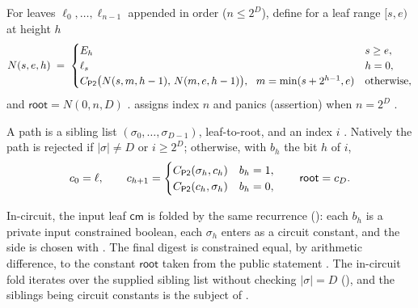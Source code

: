 \begin{definition}[Root]
For leaves $\ell_0,\dots,\ell_{n-1}$ appended in order ($n \le 2^D$), define for a
leaf range $[s,e)$ at height $h$
\begin{equation}
  N(s,e,h) \;=\;
  \begin{cases}
    E_h & s \ge e,\\
    \ell_s & h = 0,\\
    C_{\mathsf{P2}}\big(N(s,m,h-1),\,N(m,e,h-1)\big), \ \ m = \min(s+2^{h-1}, e) & \text{otherwise},
  \end{cases}
\end{equation}
and $\mathsf{root} = N(0, n, D)$ .
 assigns index $n$ and panics (assertion) when $n = 2^D$
.
\end{definition}

\begin{definition}
\label{def:ss-membership}
A path is a sibling list $(\sigma_0,\dots,\sigma_{D-1})$, leaf-to-root, and an
index $i$ . Natively the path is
rejected if $|\sigma| \ne D$ or $i \ge 2^D$; otherwise, with $b_h$ the bit $h$
of $i$,
\begin{equation}
  c_0 = \ell, \qquad
  c_{h+1} =
  \begin{cases}
    C_{\mathsf{P2}}(\sigma_h, c_h) & b_h = 1,\\
    C_{\mathsf{P2}}(c_h, \sigma_h) & b_h = 0,
  \end{cases}
  \qquad \mathsf{root} = c_D .
\end{equation}
\end{definition}

In-circuit, the input leaf $\mathsf{cm}$ is folded by the same recurrence
(): each $b_h$ is a private input constrained
boolean, each $\sigma_h$ enters as a circuit constant, and the side is chosen
with  . The final digest
is constrained equal, by arithmetic difference, to the constant
$\mathsf{root}$ taken from the public statement
. The in-circuit fold iterates
over the supplied sibling list without checking $|\sigma| = D$
(), and the siblings being circuit constants is the subject of
.

